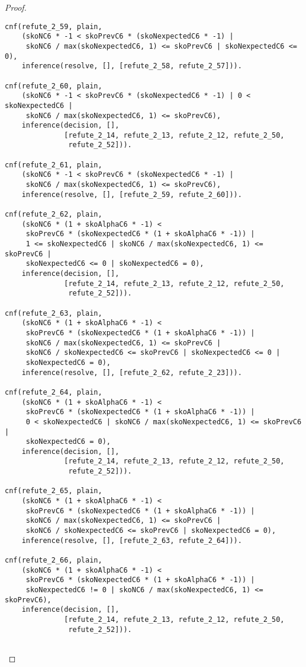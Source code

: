 \begin{proof}
\begin{verbatim}
cnf(refute_2_59, plain,
    (skoNC6 * -1 < skoPrevC6 * (skoNexpectedC6 * -1) |
     skoNC6 / max(skoNexpectedC6, 1) <= skoPrevC6 | skoNexpectedC6 <= 0),
    inference(resolve, [], [refute_2_58, refute_2_57])).

cnf(refute_2_60, plain,
    (skoNC6 * -1 < skoPrevC6 * (skoNexpectedC6 * -1) | 0 < skoNexpectedC6 |
     skoNC6 / max(skoNexpectedC6, 1) <= skoPrevC6),
    inference(decision, [],
              [refute_2_14, refute_2_13, refute_2_12, refute_2_50,
               refute_2_52])).

cnf(refute_2_61, plain,
    (skoNC6 * -1 < skoPrevC6 * (skoNexpectedC6 * -1) |
     skoNC6 / max(skoNexpectedC6, 1) <= skoPrevC6),
    inference(resolve, [], [refute_2_59, refute_2_60])).

cnf(refute_2_62, plain,
    (skoNC6 * (1 + skoAlphaC6 * -1) <
     skoPrevC6 * (skoNexpectedC6 * (1 + skoAlphaC6 * -1)) |
     1 <= skoNexpectedC6 | skoNC6 / max(skoNexpectedC6, 1) <= skoPrevC6 |
     skoNexpectedC6 <= 0 | skoNexpectedC6 = 0),
    inference(decision, [],
              [refute_2_14, refute_2_13, refute_2_12, refute_2_50,
               refute_2_52])).

cnf(refute_2_63, plain,
    (skoNC6 * (1 + skoAlphaC6 * -1) <
     skoPrevC6 * (skoNexpectedC6 * (1 + skoAlphaC6 * -1)) |
     skoNC6 / max(skoNexpectedC6, 1) <= skoPrevC6 |
     skoNC6 / skoNexpectedC6 <= skoPrevC6 | skoNexpectedC6 <= 0 |
     skoNexpectedC6 = 0),
    inference(resolve, [], [refute_2_62, refute_2_23])).

cnf(refute_2_64, plain,
    (skoNC6 * (1 + skoAlphaC6 * -1) <
     skoPrevC6 * (skoNexpectedC6 * (1 + skoAlphaC6 * -1)) |
     0 < skoNexpectedC6 | skoNC6 / max(skoNexpectedC6, 1) <= skoPrevC6 |
     skoNexpectedC6 = 0),
    inference(decision, [],
              [refute_2_14, refute_2_13, refute_2_12, refute_2_50,
               refute_2_52])).

cnf(refute_2_65, plain,
    (skoNC6 * (1 + skoAlphaC6 * -1) <
     skoPrevC6 * (skoNexpectedC6 * (1 + skoAlphaC6 * -1)) |
     skoNC6 / max(skoNexpectedC6, 1) <= skoPrevC6 |
     skoNC6 / skoNexpectedC6 <= skoPrevC6 | skoNexpectedC6 = 0),
    inference(resolve, [], [refute_2_63, refute_2_64])).

cnf(refute_2_66, plain,
    (skoNC6 * (1 + skoAlphaC6 * -1) <
     skoPrevC6 * (skoNexpectedC6 * (1 + skoAlphaC6 * -1)) |
     skoNexpectedC6 != 0 | skoNC6 / max(skoNexpectedC6, 1) <= skoPrevC6),
    inference(decision, [],
              [refute_2_14, refute_2_13, refute_2_12, refute_2_50,
               refute_2_52])).


\end{verbatim}
\end{proof}

